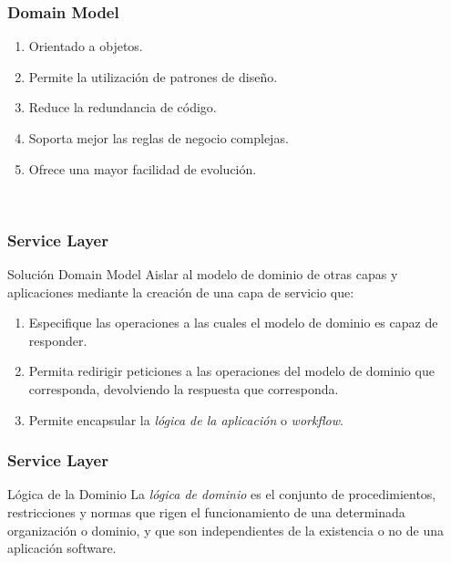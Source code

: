 \documentclass[a4paper,slidestop,xcolor=pst,dvips,blue]{beamer}
\begin{document}
\begin{frame}[c]
    \frametitle{Domain Model}
    \begin{enumerate}
        \item<2-> Orientado a objetos.
        \item<3-> Permite la utilización de patrones de diseño.
        \item<4-> Reduce la redundancia de código.
        \item<5-> Soporta mejor las reglas de negocio complejas.
        \item<6-> Ofrece una mayor facilidad de evolución.
    \end{enumerate}
    \ \\
\end{frame}

\begin{frame}[c]
    \frametitle{Service Layer}
    \begin{block}{Solución Domain Model}
        Aislar al modelo de dominio de otras capas y aplicaciones mediante la creación de una capa de servicio que:
        \begin{enumerate}
            \item Especifique las operaciones a las cuales el modelo de dominio es capaz de responder.
            \item Permita redirigir peticiones a las operaciones del modelo de dominio que corresponda, devolviendo la respuesta que corresponda.
            \item Permite encapsular la \emph{lógica de la aplicación} o \emph{workflow}.
        \end{enumerate}
    \end{block}
\end{frame}

\begin{frame}[c]
    \frametitle{Service Layer}
    \begin{block}{Lógica de la Dominio}
        La \emph{lógica de dominio} es el conjunto de procedimientos, restricciones y normas que rigen el funcionamiento de una determinada organización o dominio, y que son independientes de la existencia o no de una aplicación software.
    \end{block}
\end{frame}
\end{document}
